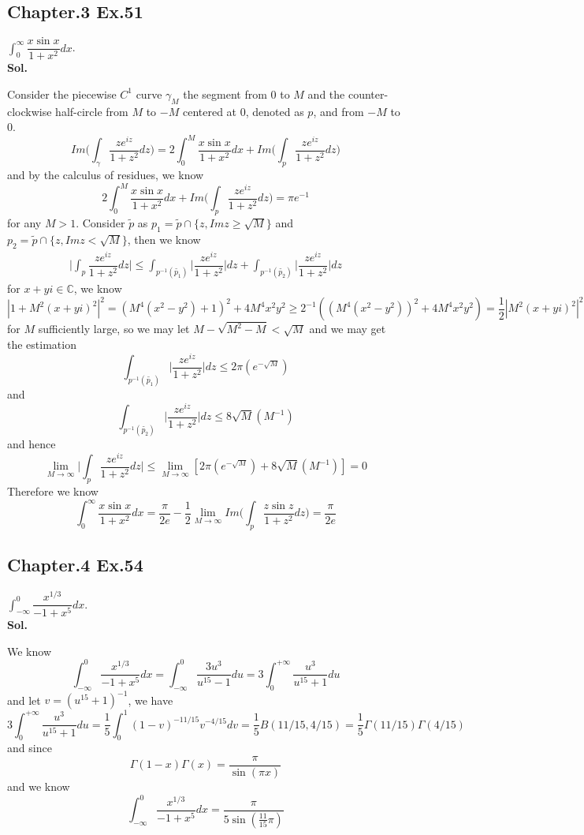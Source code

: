 \documentclass[lang=en,11pt,a4paper,citestyle =authoryear]{elegantpaper}
\newcommand{\C}{\mathbb{C}}
\begin{document}
\subsection*{Chapter.3 Ex.51} 
$\int_{0}^{\infty} \dfrac{x\sin x}{1+x^2}dx$. 
\vspace{0.5em}\\
\textbf{Sol.} \par
Consider the piecewise $C^1$ curve $\gamma_M$ the segment from $0$ to $M$ and the counter-clockwise half-circle from $M$ to $-M$ centered at $0$, denoted as $p$, and from $-M$ to $0$.
\[
Im\Big(\int_{\gamma} \dfrac{z e^{iz}}{1+z^2}dz\Big) = 2\int_0^{M} \dfrac{x\sin x}{1+x^2}dx + Im\Big(\int_{p}\dfrac{ze^{iz}}{1+z^2}dz\Big)
\]
and by the calculus of residues, we know
\[
2\int_0^{M} \dfrac{x\sin x}{1+x^2}dx + Im\Big(\int_{p}\dfrac{ze^{iz}}{1+z^2}dz\Big) = \pi e^{-1}
\]
for any $M>1$. Consider $\tilde{p}$ as $p_1 = \tilde{p}\cap\{z, Im z \geq \sqrt{M}\}$ and $p_2 = \tilde{p}\cap\{z, Im z < \sqrt{M}\}$, then we know
\[
\begin{aligned}
\Big|\int_{p}\dfrac{ze^{iz}}{1+z^2}dz\Big| \leq \int_{p^{-1}(\tilde{p_1})} \Big|\dfrac{ze^{iz}}{1+z^2}\Big| dz + \int_{p^{-1}(\tilde{p_2})} \Big|\dfrac{ze^{iz}}{1+z^2}\Big| dz
\end{aligned}
\]
for $x+yi\in \C$, we know
\[
|1+M^2(x+yi)^2|^2 = (M^4(x^2-y^2)+1)^2+4M^4x^2y^2 \geq 2^{-1}((M^4(x^2-y^2))^2+4M^4x^2y^2) = \dfrac{1}{2}|M^2(x+yi)^2|^2
\]
for $M$ sufficiently large, so we may let $M-\sqrt{M^2-M}<\sqrt{M}$ and we may get the estimation
\[
\int_{p^{-1}(\tilde{p_1})} \Big|\dfrac{ze^{iz}}{1+z^2}\Big| dz \leq 2 \pi(e^{-\sqrt{M}}) 
\]
and
\[
\int_{p^{-1}(\tilde{p_2})} \Big|\dfrac{ze^{iz}}{1+z^2}\Big| dz \leq 8\sqrt{M}(M^{-1}) 
\]
and hence
\[ 
\lim_{M\to\infty} \Big|\int_{p}\dfrac{ze^{iz}}{1+z^2}dz\Big| \leq \lim_{M\to\infty}[2\pi (e^{-\sqrt{M}}) + 8\sqrt{M}(M^{-1})] = 0
\]
Therefore we know
\[
\int_{0}^{\infty} \dfrac{x\sin x}{1+x^2}dx = \dfrac{\pi }{2e} - \dfrac{1}{2}\lim_{M\to\infty} Im\Big(\int_{p}\dfrac{z\sin z}{1+z^2}dz\Big) = \dfrac{\pi}{2e}
\]
\par
\vspace{0.5em}

\subsection*{Chapter.4 Ex.54} 
$\int_{-\infty}^0 \dfrac{x^{1/3}}{-1+x^5} dx$. 
\vspace{0.5em}\\
\textbf{Sol.} \par
We know
\[\int_{-\infty}^0 \dfrac{x^{1/3}}{-1+x^5} dx = \int_{-\infty}^0 \dfrac{3u^3}{u^{15}-1}du = 3\int_0^{+\infty} \dfrac{u^3}{u^{15}+1}du \]
and let $v = (u^{15}+1)^{-1}$, we have
\[
3\int_0^{+\infty} \dfrac{u^3}{u^{15}+1}du = \dfrac{1}{5}\int_0^{1} (1-v)^{-11/15}v^{-4/15}dv =\dfrac{1}{5}B(11/15,4/15) = \dfrac{1}{5}\Gamma(11/15)\Gamma(4/15)
\]
and since
\[\Gamma(1-x)\Gamma(x) = \dfrac{\pi}{\sin(\pi x)}\]
and we know
\[
\int_{-\infty}^0 \dfrac{x^{1/3}}{-1+x^5} dx = \dfrac{\pi}{5\sin(\tfrac{11}{15}\pi)}
\]
\vspace{0.5em}
\end{document}
